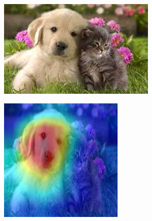 \begin{figure}[htb]
    \centering
    \begin{subfigure}{0.2\linewidth}
        \includegraphics[width=\linewidth, height=\linewidth]{resources/related_works/gradcam_original.jpg}
    \end{subfigure}
    \begin{subfigure}{0.2\linewidth}
        \includegraphics[width=\linewidth]{resources/related_works/gradcam_dog.jpg}

\end{subfigure}
\end{figure}
